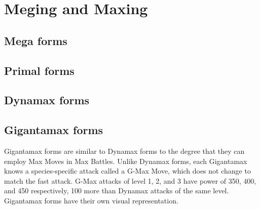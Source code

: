 \chapter{Meging and Maxing}
\label{chap:megmax}

\section{Mega forms}
\label{section:mega}


\section{Primal forms}
\label{section:primal}

\section{Dynamax forms}
\label{section:dmax}


\section{Gigantamax forms}
\label{section:gmax}
Gigantamax forms are similar to Dynamax forms to the degree that they can
  employ Max Moves in Max Battles.
Unlike Dynamax forms, each Gigantamax knows a species-specific attack
  called a G-Max Move, which does not change to match the fast attack.
G-Max attacks of level 1, 2, and 3 have power of 350, 400, and 450
  respectively, 100 more than Dynamax attacks of the same level.
Gigantamax forms have their own visual representation.

